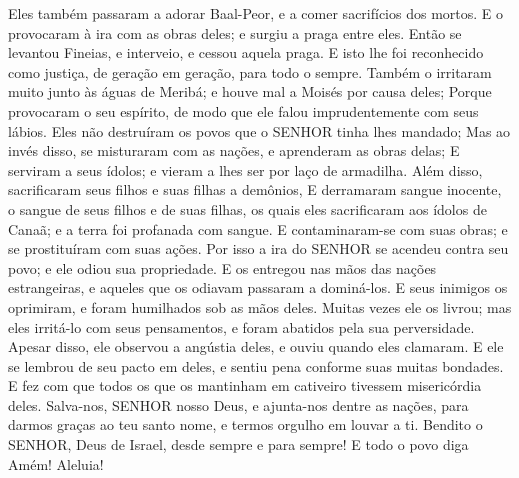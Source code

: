 {  Eles também passaram a adorar Baal-Peor, e a comer sacrifícios dos mortos.
  E o provocaram à ira com as obras deles; e
{} surgiu a praga entre eles.
  Então se levantou Fineias, e interveio, e cessou aquela praga.
  E isto lhe foi reconhecido como justiça, de geração em geração, para todo o sempre.
  Também o irritaram muito junto às águas de Meribá; e houve mal a Moisés por causa deles;
  Porque provocaram o seu espírito, de modo que ele falou imprudentemente com seus lábios.
  Eles não destruíram os povos que o SENHOR tinha lhes mandado;
  Mas ao invés disso, se misturaram com as nações, e aprenderam as obras delas;
  E serviram a seus ídolos; e vieram a lhes ser por laço de armadilha.
  Além disso, sacrificaram seus filhos e suas filhas a demônios,
  E derramaram sangue inocente, o sangue de seus filhos e de suas filhas, os quais eles sacrificaram aos ídolos de Canaã; e a terra foi profanada com
{} sangue.
  E contaminaram-se com suas obras; e se prostituíram com suas ações.
  Por isso a ira do SENHOR se acendeu contra seu povo; e ele odiou sua propriedade.
  E os entregou nas mãos das nações estrangeiras, e aqueles que os odiavam passaram a dominá-los.
  E seus inimigos os oprimiram, e foram humilhados sob as mãos deles.
  Muitas vezes ele os livrou; mas eles
{} irritá-lo com seus pensamentos, e foram abatidos pela sua perversidade.
  Apesar disso, ele observou a angústia deles, e ouviu quando eles clamaram.
  E ele se lembrou de seu pacto em
{} deles, e sentiu pena conforme suas muitas bondades.
  E fez com que todos os que os mantinham em cativeiro tivessem misericórdia deles.
  Salva-nos, SENHOR nosso Deus, e ajunta-nos dentre as nações, para darmos graças ao teu santo nome, e termos orgulho em louvar a ti.
  Bendito
{} o SENHOR, Deus de Israel, desde sempre e para sempre! E todo o povo diga Amém! Aleluia!
\par }

